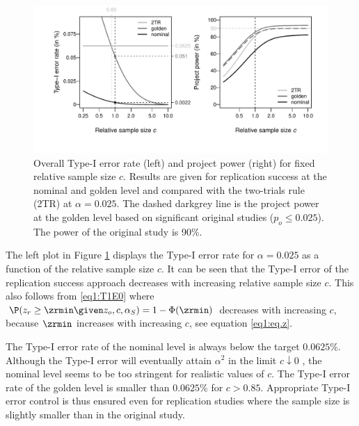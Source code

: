 \begin{figure}[!h]
\centering

\begin{knitrout}
\color{fgcolor}

{\centering \includegraphics[width=\maxwidth]{images/paper1/fig4-1}

}

\end{knitrout}

\caption{Overall Type-I error rate (left) and project power (right) for fixed
  relative sample size $c$. Results are given for replication success at the
  nominal and golden level and compared with the two-trials rule (2TR) at
  $\alpha = 0.025$. The dashed darkgrey line is the project power at the golden
  level based on significant original studies ($p_o \leq 0.025$). The power of
  the original study is 90\%.}
\label{fig1:fig4}
\end{figure}


The left plot in Figure \ref{fig1:fig4} displays the Type-I error rate for
$\alpha=0.025$ as a function of the relative sample size $c$. It can be seen
that the Type-I error of the replication success approach decreases with
increasing relative sample size $c$. This also follows from \eqref{eq1:T1E0}
where $\P(z_r \geq \zrmin \given z_o, c, \alpha_S) = 1 - \Phi(\zrmin)$ decreases
with increasing $c$, because $\zrmin$ increases with increasing $c$, see
equation \eqref{eq1:eq.z}.


The Type-I error rate of the nominal level is always below the target
$0.0625$\%. Although the Type-I error will eventually attain $\alpha^2$ in the
limit $c \downarrow 0$ \citep[Section 3.4]{Held2020}, the nominal level seems to
be too stringent for realistic values of $c$. The Type-I error rate of the
golden level is smaller than $0.0625$\% for $c >0.85$. Appropriate Type-I error
control is thus ensured even for replication studies where the sample size is
slightly smaller than in the original study.

